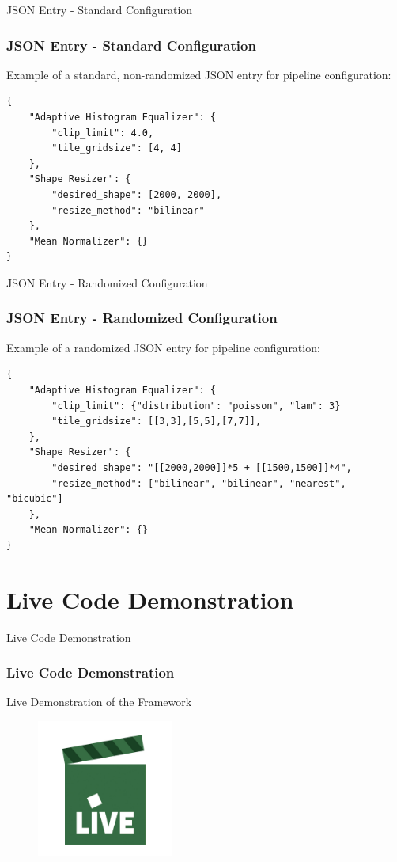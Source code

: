 \begin{frame}[fragile]{JSON Entry - Standard Configuration}
    \frametitle{JSON Entry - Standard Configuration}
    Example of a standard, non-randomized JSON entry for pipeline configuration:

    \begin{lstlisting}[caption={Standard JSON Configuration.}, label=lst:json_standard, basicstyle=\scriptsize\ttfamily, stringstyle=\color{black}]
{
    "Adaptive Histogram Equalizer": {
        "clip_limit": 4.0,
        "tile_gridsize": [4, 4]
    },
    "Shape Resizer": {
        "desired_shape": [2000, 2000],
        "resize_method": "bilinear"
    },
    "Mean Normalizer": {}
}
    \end{lstlisting}
\end{frame}

\begin{frame}[fragile]{JSON Entry - Randomized Configuration}
    \frametitle{JSON Entry - Randomized Configuration}
    Example of a randomized JSON entry for pipeline configuration:

    \begin{lstlisting}[caption={Randomized JSON Configuration.}, label=lst:json_randomized, basicstyle=\scriptsize\ttfamily, stringstyle=\color{black}]
{
    "Adaptive Histogram Equalizer": {
        "clip_limit": {"distribution": "poisson", "lam": 3}
        "tile_gridsize": [[3,3],[5,5],[7,7]],
    },
    "Shape Resizer": {
        "desired_shape": "[[2000,2000]]*5 + [[1500,1500]]*4",
        "resize_method": ["bilinear", "bilinear", "nearest", "bicubic"]
    },
    "Mean Normalizer": {}
}
    \end{lstlisting}
\end{frame}

\section{Live Code Demonstration}
\label{live_code_demonstration_section}

\begin{frame}{Live Code Demonstration}
    \frametitle{Live Code Demonstration}
    \begin{center}
        \LARGE{Live Demonstration of the Framework}
    \end{center}
    \vspace{1em}
    \begin{figure}
        \includegraphics[width=0.4\textwidth]{figures/live_demo.jpg} 
        \label{fig:sampleimage}
      \end{figure}
\end{frame}
